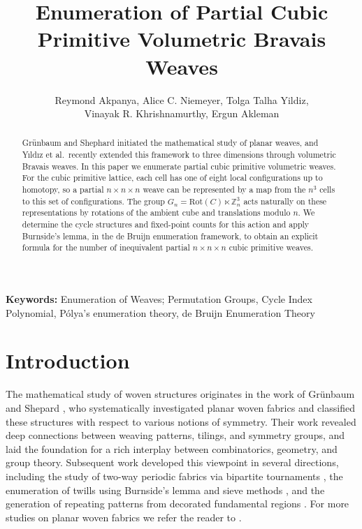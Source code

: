 \documentclass[12pt]{article}
\title{Enumeration of Partial Cubic Primitive Volumetric Bravais Weaves}
\author{Reymond Akpanya, Alice C. Niemeyer, Tolga Talha Yildiz,\\ Vinayak R. Khrishnamurthy, Ergun Akleman}
\newcommand{\keywords}[1]{%
  \par\noindent\textbf{Keywords: }#1
}
\theoremstyle{definition}
\theoremstyle{remark}
\begin{document}
\maketitle
\begin{abstract}
Gr\"unbaum and Shephard initiated the mathematical study of planar weaves,
and Y{\i}ld{\i}z et al.\ recently extended this framework to three
dimensions through volumetric Bravais weaves. In this paper we enumerate
partial cubic primitive volumetric weaves. For the cubic primitive lattice,
each cell has one of eight local configurations up to homotopy, so a partial
$n\times n\times n$ weave can be represented by a map from the $n^3$ cells
to this set of configurations. The group
$G_n=\mathrm{Rot}(C)\ltimes \mathbb Z_n^3$
acts naturally on these representations by rotations of the ambient cube
and translations modulo $n$. We determine the cycle structures and
fixed-point counts for this action and apply Burnside's lemma, in the
de Bruijn enumeration framework, to obtain an explicit formula for the
number of inequivalent partial $n\times n\times n$ cubic primitive weaves.
\end{abstract}



\keywords{Enumeration of  Weaves; Permutation Groups, Cycle Index Polynomial, Pólya’s enumeration theory, de Bruijn Enumeration Theory}



\section{Introduction}
\label{sec:intro}

The mathematical study of woven structures originates in the work of Grünbaum and Shepard \cite{Grunbaum80}, who systematically investigated planar woven fabrics and classified these structures with respect to various notions of symmetry. Their work revealed deep connections between weaving patterns, tilings, and symmetry groups, and laid the foundation for a rich interplay between combinatorics, geometry, and group theory.
Subsequent work developed this
viewpoint in several directions, including the study of two-way periodic fabrics via bipartite
tournaments \cite{Clapham85}, the enumeration of twills using Burnside’s lemma and sieve methods \cite{MR729012}, and the generation of repeating patterns from decorated fundamental regions \cite{MR2305591}.
For more studies on planar woven fabrics we refer the reader to \cite{MR3371613,Grunbaum86,Roth1995,Thomas2010}.
\end{document}
